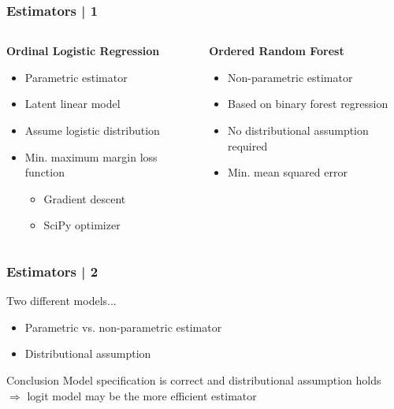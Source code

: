 \documentclass{beamer}
\begin{document}
\begin{frame}
	\frametitle{Estimators | 1}

	\begin{columns}[T]
		\begin{column}{.48\textwidth}
			\textbf{Ordinal Logistic Regression}

			\begin{itemize}
				\item Parametric estimator
				\item Latent linear model
				\item Assume logistic distribution
				\item Min. maximum margin loss function
				\begin{itemize}
					\item Gradient descent
					\item SciPy optimizer
				\end{itemize}
			\end{itemize}

		\end{column}

		\begin{column}{.48\textwidth}
			\textbf{Ordered Random Forest}

			\begin{itemize}
				\item Non-parametric estimator
				\item Based on binary forest regression
				\item No distributional assumption required
				\item Min. mean squared error
			\end{itemize}

		\end{column}
	\end{columns}

\end{frame}


\begin{frame}
	\frametitle{Estimators | 2}

	Two different models...

	\begin{itemize}
		\item Parametric vs. non-parametric estimator
		\item Distributional assumption
	\end{itemize}

	\vfill

	\begin{block}{Conclusion}
		Model specification is correct and distributional assumption holds\\
		$\Rightarrow$ logit model may be the more efficient estimator
	\end{block}

\end{frame}
\end{document}
